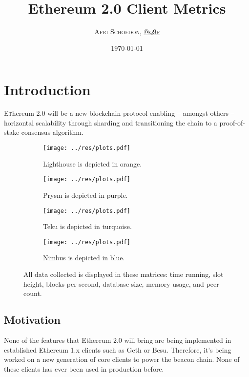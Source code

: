 \documentclass[twoside,twocolumn]{article}
\title{Ethereum 2.0 Client Metrics}
\author{\textsc{Afri Schoedon, \href{https://github.com/q9f}{@q9f}}}\date{\today}
\begin{document}
\maketitle
\section{Introduction}
\lettrine[nindent=0em,lines=3]{E}thereum 2.0 will be a new blockchain protocol enabling -- amongst others -- horizontal scalability through sharding and transitioning the chain to a proof-of-stake consensus algorithm.\par

\begin{figure}
   \centering
   \begin{subfigure}[t]{0.48\textwidth}
     \centering
     \texttt{[image: ../res/plots.pdf]}
     \caption{Lighthouse is depicted in orange.}
     \label{img:lh}
   \end{subfigure}
   \begin{subfigure}[t]{0.48\textwidth}
     \centering
     \texttt{[image: ../res/plots.pdf]}
     \caption{Prysm is depicted in purple.}
     \label{img:pr}
   \end{subfigure}
   \begin{subfigure}[t]{0.48\textwidth}
     \centering
     \texttt{[image: ../res/plots.pdf]}
     \caption{Teku is depicted in turquoise.}
     \label{img:tk}
   \end{subfigure}
   \begin{subfigure}[t]{0.48\textwidth}
     \centering
     \texttt{[image: ../res/plots.pdf]}
     \caption{Nimbus is depicted in blue.}
     \label{img:nb}
   \end{subfigure}
  \caption{All data collected is displayed in these matrices: time running, slot height, blocks per second, database size, memory usage, and peer count.}
  \label{fig:cli}
\end{figure}

\subsection{Motivation}
None of the features that Ethereum 2.0 will bring are being implemented in established Ethereum 1.x clients such as Geth or Besu. Therefore, it's being worked on a new generation of core clients to power the beacon chain. None of these clients has ever been used in production before.\par
\end{document}
